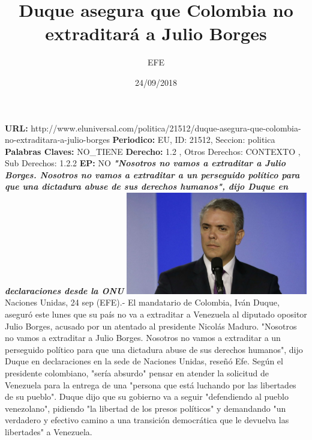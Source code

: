 \documentclass{article}%
\title{\textbf{Duque asegura que Colombia no extraditará a Julio Borges}}%
\author{EFE}%
\date{24/09/2018}%
\begin{document}
%
\normalsize%
\maketitle%
\textbf{URL: }%
http://www.eluniversal.com/politica/21512/duque{-}asegura{-}que{-}colombia{-}no{-}extraditara{-}a{-}julio{-}borges\newline%
%
\textbf{Periodico: }%
EU, %
ID: %
21512, %
Seccion: %
politica\newline%
%
\textbf{Palabras Claves: }%
NO\_TIENE\newline%
%
\textbf{Derecho: }%
1.2%
, Otros Derechos: %
CONTEXTO%
, Sub Derechos: %
1.2.2%
\newline%
%
\textbf{EP: }%
NO\newline%
\newline%
%
\textbf{\textit{"Nosotros no vamos a extraditar a Julio Borges. Nosotros no vamos a extraditar a un perseguido político para que una dictadura abuse de sus derechos humanos", dijo Duque en declaraciones desde la ONU}}%
\newline%
\newline%
%
\includegraphics[width=300px]{248.jpg}%
\newline%
%
Naciones Unidas, 24 sep (EFE).{-} El mandatario de Colombia, Iván Duque, aseguró este lunes que su país no va a extraditar a Venezuela al diputado opositor Julio Borges, acusado por un atentado al presidente Nicolás Maduro.%
\newline%
%
"Nosotros no vamos a extraditar a Julio Borges. Nosotros no vamos a extraditar a un perseguido político para que una dictadura abuse de sus derechos humanos", dijo Duque en declaraciones en la sede de Naciones Unidas, reseñó Efe.%
\newline%
%
Según el presidente colombiano, "sería absurdo" pensar en atender la solicitud de Venezuela para la entrega de una "persona que está luchando por las libertades de su pueblo".%
\newline%
%
Duque dijo que su gobierno va a seguir "defendiendo al pueblo venezolano", pidiendo "la libertad de los presos políticos" y demandando "un verdadero y efectivo camino a una transición democrática que le devuelva las libertades" a Venezuela.%
\end{document}
